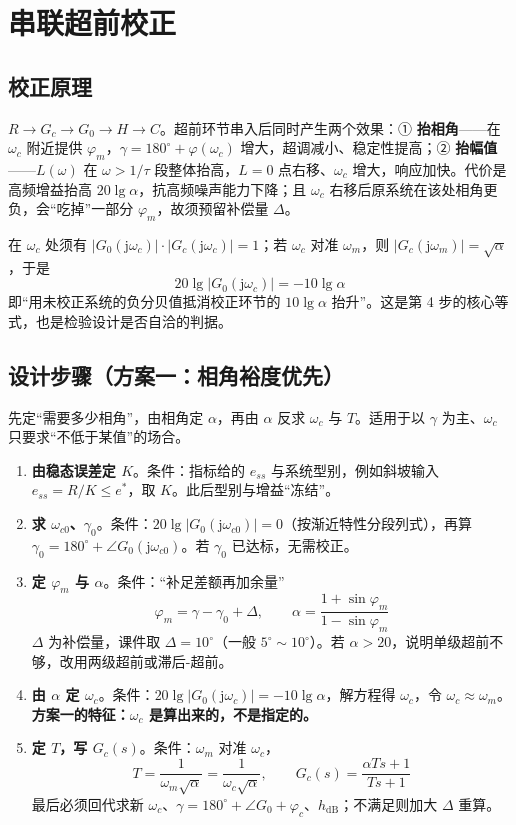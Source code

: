 \bigskip

\section{串联超前校正}

\subsection{校正原理}
$R\to G_c\to G_0\to H\to C$。超前环节串入后同时产生两个效果：① \textbf{抬相角}——在 $\omega_c$ 附近提供 $\varphi_m$，$\gamma=180^\circ+\varphi(\omega_c)$ 增大，超调减小、稳定性提高；② \textbf{抬幅值}——$L(\omega)$ 在 $\omega>1/\tau$ 段整体抬高，$L=0$ 点右移、$\omega_c$ 增大，响应加快。代价是高频增益抬高 $20\lg\alpha$，抗高频噪声能力下降；且 $\omega_c$ 右移后原系统在该处相角更负，会“吃掉”一部分 $\varphi_m$，故须预留补偿量 $\Delta$。

在 $\omega_c$ 处须有 $|G_0(\mathrm{j}\omega_c)|\cdot|G_c(\mathrm{j}\omega_c)|=1$；若 $\omega_c$ 对准 $\omega_m$，则 $|G_c(\mathrm{j}\omega_m)|=\sqrt{\alpha}$，于是
\[
\boxed{\ 20\lg\bigl|G_0(\mathrm{j}\omega_c)\bigr|=-10\lg\alpha\ }
\]
即“用未校正系统的负分贝值抵消校正环节的 $10\lg\alpha$ 抬升”。这是第 4 步的核心等式，也是检验设计是否自洽的判据。

\subsection{设计步骤（方案一：相角裕度优先）}
先定“需要多少相角”，由相角定 $\alpha$，再由 $\alpha$ 反求 $\omega_c$ 与 $T$。适用于以 $\gamma$ 为主、$\omega_c$ 只要求“不低于某值”的场合。
\begin{enumerate}
    \item \textbf{由稳态误差定 $K$}。条件：指标给的 $e_{ss}$ 与系统型别，例如斜坡输入 $e_{ss}=R/K\le e^*$，取 $K$。此后型别与增益“冻结”。
    \item \textbf{求 $\omega_{c0}$、$\gamma_0$}。条件：$20\lg|G_0(\mathrm{j}\omega_{c0})|=0$（按渐近特性分段列式），再算 $\gamma_0=180^\circ+\angle G_0(\mathrm{j}\omega_{c0})$。若 $\gamma_0$ 已达标，无需校正。
    \item \textbf{定 $\varphi_m$ 与 $\alpha$}。条件：“补足差额再加余量”
    \[
    \varphi_m=\gamma-\gamma_0+\Delta,\qquad \alpha=\frac{1+\sin\varphi_m}{1-\sin\varphi_m}
    \]
    $\Delta$ 为补偿量，课件取 $\Delta=10^\circ$（一般 $5^\circ\sim10^\circ$）。若 $\alpha>20$，说明单级超前不够，改用两级超前或滞后-超前。
    \item \textbf{由 $\alpha$ 定 $\omega_c$}。条件：$20\lg|G_0(\mathrm{j}\omega_c)|=-10\lg\alpha$，解方程得 $\omega_c$，令 $\omega_c\approx\omega_m$。\textbf{方案一的特征：$\omega_c$ 是算出来的，不是指定的。}
    \item \textbf{定 $T$，写 $G_c(s)$}。条件：$\omega_m$ 对准 $\omega_c$，
    \[
    T=\frac{1}{\omega_m\sqrt{\alpha}}=\frac{1}{\omega_c\sqrt{\alpha}},\qquad
    G_c(s)=\frac{\alpha Ts+1}{Ts+1}
    \]
    最后必须回代求新 $\omega_c$、$\gamma=180^\circ+\angle G_0+\varphi_c$、$h_{\mathrm{dB}}$；不满足则加大 $\Delta$ 重算。
\end{enumerate}

